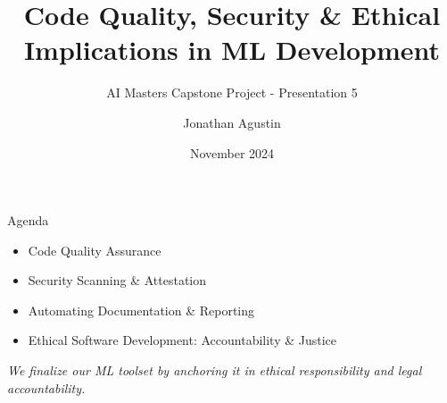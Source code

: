 \documentclass[aspectratio=169]{beamer}
\title{Code Quality, Security \& Ethical Implications in ML Development}
\subtitle{AI Masters Capstone Project - Presentation 5}
\author{Jonathan Agustin}
\date{November 2024}
\begin{document}
%
%
\maketitle

%
%
\begin{frame}{Agenda}
\begin{itemize}
\item Code Quality Assurance
\item Security Scanning \& Attestation
\item Automating Documentation \& Reporting
\item Ethical Software Development: Accountability \& Justice
\end{itemize}

\vspace{0.8em}
\emph{We finalize our ML toolset by anchoring it in ethical responsibility and legal accountability.}
\end{frame}
\end{document}

